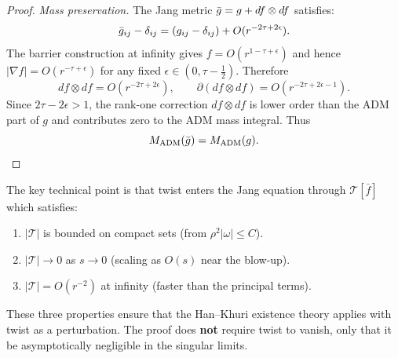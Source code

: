 \begin{proof}
\textit{Mass preservation.} The Jang metric $\bar{g} = g + df \otimes df$ satisfies:
\[
\bar{g}_{ij} - \delta_{ij} = (g_{ij} - \delta_{ij}) + O(r^{-2\tau+2\epsilon}).
\]
The barrier construction at infinity gives $f=O(r^{1-\tau+\epsilon})$ and hence $|\nabla f|=O(r^{-\tau+\epsilon})$ for any fixed $\epsilon \in (0,\tau-\tfrac12)$. Therefore
\[
df\otimes df = O(r^{-2\tau+2\epsilon}),
\qquad
\partial(df\otimes df)=O(r^{-2\tau+2\epsilon-1}).
\]
Since $2\tau-2\epsilon>1$, the rank-one correction $df\otimes df$ is lower order than the ADM part of $g$ and contributes zero to the ADM mass integral. Thus
\[
M_{\mathrm{ADM}}(\bar{g})=M_{\mathrm{ADM}}(g).
\]
\end{proof}

\begin{remark}
The key technical point is that twist enters the Jang equation through $\mathcal{T}[\bar{f}]$ which satisfies:
\begin{enumerate}
    \item $|\mathcal{T}|$ is bounded on compact sets (from $\rho^2|\omega| \leq C$).
    \item $|\mathcal{T}| \to 0$ as $s \to 0$ (scaling as $O(s)$ near the blow-up).
    \item $|\mathcal{T}| = O(r^{-2})$ at infinity (faster than the principal terms).
\end{enumerate}
These three properties ensure that the Han--Khuri existence theory applies with twist as a perturbation. The proof does \textbf{not} require twist to vanish, only that it be asymptotically negligible in the singular limits.
\end{remark}

